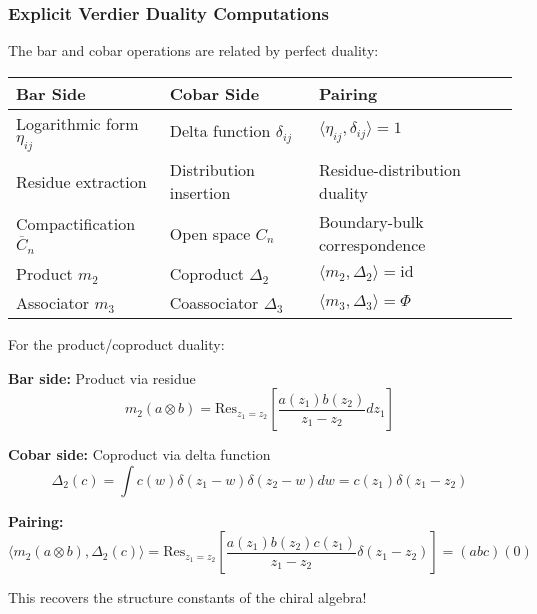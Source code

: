 \subsubsection{Explicit Verdier Duality Computations}

\begin{theorem}
The bar and cobar operations are related by perfect duality:

\begin{center}
\begin{tabular}{|l|l|l|}
\hline
\textbf{Bar Side} & \textbf{Cobar Side} & \textbf{Pairing} \\
\hline
Logarithmic form $\eta_{ij}$ & Delta function $\delta_{ij}$ & $\langle \eta_{ij}, \delta_{ij} \rangle = 1$ \\
Residue extraction & Distribution insertion & Residue-distribution duality \\
Compactification $\overline{C}_n$ & Open space $C_n$ & Boundary-bulk correspondence \\
Product $m_2$ & Coproduct $\Delta_2$ & $\langle m_2, \Delta_2 \rangle = \text{id}$ \\
Associator $m_3$ & Coassociator $\Delta_3$ & $\langle m_3, \Delta_3 \rangle = \Phi$ \\
\hline
\end{tabular}
\end{center}
\end{theorem}

\begin{example}
For the product/coproduct duality:

\textbf{Bar side:} Product via residue
$$m_2(a \otimes b) = \text{Res}_{z_1=z_2}\left[\frac{a(z_1)b(z_2)}{z_1-z_2}dz_1\right]$$

\textbf{Cobar side:} Coproduct via delta function
$$\Delta_2(c) = \int c(w) \delta(z_1-w)\delta(z_2-w) dw = c(z_1)\delta(z_1-z_2)$$

\textbf{Pairing:}
$$\langle m_2(a \otimes b), \Delta_2(c) \rangle = \text{Res}_{z_1=z_2}\left[\frac{a(z_1)b(z_2)c(z_1)}{z_1-z_2}\delta(z_1-z_2)\right] = (abc)(0)$$

This recovers the structure constants of the chiral algebra!
\end{example}


